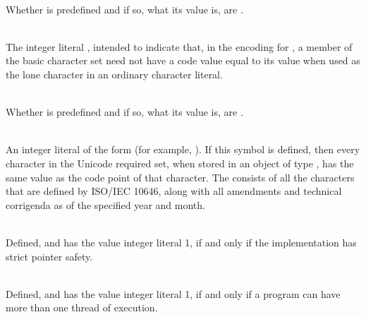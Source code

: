 \begin{description}
%
\item {}\\
Whether  is predefined and if so, what its value is,
are .

%
\item {}\\
The integer literal , intended to indicate that, in the encoding for
, a member of the basic character set need not have a code value equal to
its value when used as the lone character in an ordinary character literal.

%
\item {}\\
Whether  is predefined and if so, what its value is,
are .

%
\item {}\\
An integer literal of the form  (for example,
).
If this symbol is defined, then every character in the Unicode required set, when
stored in an object of type , has the same value as the code point
of that character. The  consists of all
the characters that are defined by ISO/IEC 10646, along with
all amendments and technical corrigenda as of the specified year and month.

%
\item {}\\
Defined, and has the value integer literal 1, if and only if the implementation
has strict pointer safety.

%
\item {}\\
Defined, and has the value integer literal 1, if and only if a program
can have more than one thread of execution.

\end{description}

